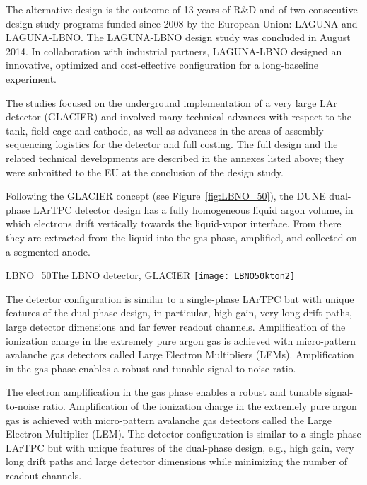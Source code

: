 The alternative design is the outcome of 13 years of R\&D and of two
consecutive design study programs funded since 2008 by the European
Union: LAGUNA and LAGUNA-LBNO. The LAGUNA-LBNO design study was
concluded in August 2014.  In collaboration with industrial partners,
LAGUNA-LBNO designed an innovative, optimized and cost-effective
configuration for a long-baseline experiment.

The studies focused on the underground implementation of a very large
LAr detector (GLACIER) and involved  many technical advances with respect to
the tank, field cage and cathode, as well as advances in the areas of %
assembly sequencing logistics for the detector and full costing. The full design and the related
technical developments are described in the annexes listed above; they were submitted to the
EU at the conclusion of the design study. %

Following the GLACIER concept\cite{LAGUNA-LBNO-deliv} (see
Figure~\ref{fig:LBNO_50}), the DUNE dual-phase LArTPC detector design 
has a fully homogeneous liquid argon volume, in which electrons
drift vertically towards the liquid-vapor interface. From there they
are extracted from the liquid into the gas phase, amplified, and
collected on a segmented
anode\cite{Badertscher:2013wm,Badertscher:2012dq,Badertscher:2010zg}. 
%
\begin{cdrfigure}{LBNO_50}{The  LBNO detector, GLACIER}
\texttt{[image: LBNO50kton2]}
\end{cdrfigure}
%
The detector configuration is similar to a single-phase LArTPC
but with unique features of the dual-phase design, in particular, high gain,
very long drift paths, large detector dimensions and far fewer %
readout channels. Amplification of the ionization charge
in the extremely pure argon gas is achieved with micro-pattern
avalanche gas detectors called Large Electron Multipliers
(LEMs). Amplification in the gas phase enables a robust and
tunable signal-to-noise ratio. 

The electron amplification in the gas phase enables a robust and
tunable signal-to-noise ratio. Amplification of the ionization charge
in the extremely pure argon gas is achieved with micro-pattern
avalanche gas detectors called the Large Electron Multiplier
(LEM). The detector configuration is similar to a single-phase LArTPC
but with  unique features of the dual-phase design, e.g., high gain,
very long drift paths and large detector dimensions while minimizing
the number of readout channels.


